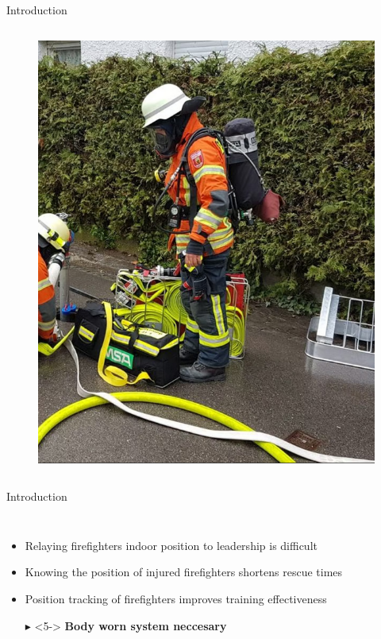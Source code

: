 \documentclass[aspectratio=169]{beamer}
\begin{document}
{\begin{frame}{Introduction}
\begin{columns}
			\begin{figure}
				\centering
				\includegraphics[height=0.7\textheight]{firefighter.png}
			\end{figure}
			
		\end{columns}
		
		
	\end{frame}
	
	\begin{frame}{Introduction}
			\begin{columns}
				\begin{itemize}
					\item<2-> Relaying firefighters indoor position to leadership is difficult
					\item<3-> Knowing the position of injured firefighters shortens rescue times
					\item<4-> Position tracking of firefighters improves training effectiveness
					\item[$\blacktriangleright$]<5-> \textbf{Body worn system neccesary}
				\end{itemize}
		

\end{columns}
\end{frame}}
\end{document}
